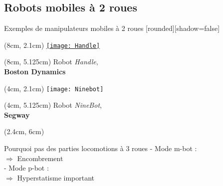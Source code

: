 \documentclass[french]{beamer}
\begin{document}
\subsection{Robots mobiles à 2 roues}
\begin{frame}{Exemples de manipulateurs mobiles à 2 roues}
[rounded][shadow=false]
{\small %
}
\begin{textblock*}{3cm}(8cm, 2.1cm)
\centering
\href{run:./Figures/Handle_Vid.mp4}{\texttt{[image: Handle]}}
\end{textblock*}
\begin{textblock*}{3cm}(8cm, 5.125cm)
\centering
\tiny{Robot \textit{Handle},\\ \textbf{Boston Dynamics}}
\end{textblock*}
\begin{textblock*}{3cm}(4cm, 2.1cm)
\centering
\texttt{[image: Ninebot]}
\end{textblock*}
\begin{textblock*}{3cm}(4cm, 5.125cm)
\centering
\tiny{Robot \textit{NineBot},\\ \textbf{Segway}}
\end{textblock*}


%

{\small %
\begin{textblock*}{8cm}(2.4cm, 6cm)
\begin{block}{Pourquoi pas des parties locomotions à 3 roues}
- Mode m-bot : \\
\hspace{0.5cm}$\Rightarrow$ Encombrement\\
- Mode p-bot : \\
\hspace{0.5cm}$\Rightarrow$ Hyperstatisme important
\end{block}
\end{textblock*}

}
\end{frame}
\end{document}
